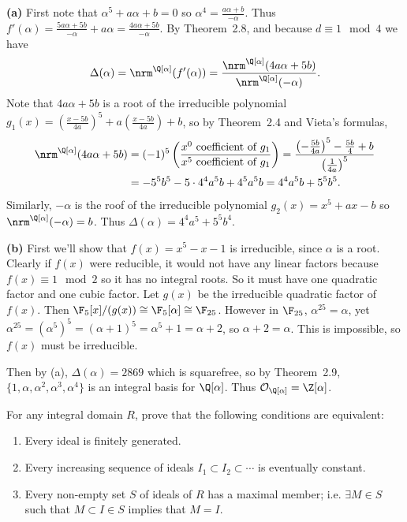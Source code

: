 \documentclass[11pt,letterpaper]{article}
\begin{document}
\begin{solution}
    \textbf{(a)} First note that $\alpha^5+a\alpha+b=0$ so $\alpha^4=\frac{a\alpha+b}{-\alpha}$. Thus $f'(\alpha)=\frac{5a\alpha+5b}{-\alpha}+a\alpha=\frac{4a\alpha+5b}{-\alpha}$. By Theorem~2.8, and because $d\equiv 1\mod 4$ we have
    \[
        \Delta(\alpha)=\nrm^{\Q[\alpha]}(f'(\alpha))=\frac{\nrm^{\Q[\alpha]}(4a\alpha+5b)}{\nrm^{\Q[\alpha]}(-\alpha)}
    .\]  
    Note that $4a\alpha+5b$ is a root of the irreducible polynomial $g_1(x)=\left(\frac{x-5b}{4a}\right)^5+a\left(\frac{x-5b}{4a}\right)+b$, so by Theorem~2.4 and Vieta's formulas,
    \[
        \begin{aligned}
            \nrm^{\Q[\alpha]}(4a\alpha+5b)&=(-1)^5\left(\frac{x^0\textrm{ coefficient of }g_1}{x^5\textrm{ coefficient of }g_1}\right)=\frac{\left(-\frac{5b}{4a}\right)^5-\frac{5b}{4}+b}{\left(\frac{1}{4a}\right)^5}\\
            &=-5^5b^5-5\cdot 4^4a^5b+4^5a^5b=4^4a^5b+5^5b^5.
        \end{aligned}
    \]  
    Similarly, $-\alpha$ is the roof of the irreducible polynomial $g_2(x)=x^5+ax-b$ so $\nrm^{\Q[\alpha]}(-\alpha)=b$. Thus $\Delta(\alpha)=4^4a^5+5^5b^4$.

    \textbf{(b)} First we'll show that $f(x)=x^5-x-1$ is irreducible, since $\alpha$ is a root. Clearly if $f(x)$ were reducible, it would not have any linear factors because $f(x)\equiv 1\mod 2$ so it has no integral roots. So it must have one quadratic factor and one cubic factor. Let $g(x)$ be the irreducible quadratic factor of $f(x)$. Then $\F_5[x]/(g(x))\cong \F_5[\alpha]\cong \F_{25}$. However in $\F_{25}$, $\alpha^25=\alpha$, yet $\alpha^25=(\alpha^5)^5=(\alpha+1)^5=\alpha^5+1=\alpha+2$, so $\alpha+2=\alpha$. This is impossible, so $f(x)$ must be irreducible.  
    
    Then by (a), $\Delta(\alpha)=2869$ which is squarefree, so by Theorem~2.9, $\{1,\alpha,\alpha^2,\alpha^3,\alpha^4\}$ is an integral basis for $\Q[\alpha]$. Thus $\mathcal{O}_{\Q[\alpha]}=\Z[\alpha]$.  
\end{solution}

\begin{cproblem}{3.1}
    For any integral domain $R$, prove that the following conditions are equivalent:
    \begin{enumerate}
        \item Every ideal is finitely generated.
        \item Every increasing sequence of ideals $I_1\subset I_2\subset \cdots$ is eventually constant.
        \item Every non-empty set $S$ of ideals of $R$ has a maximal member; i.e. $\exists M \in S$ such that $M\subset I\in S$ implies that $M=I$. 
    \end{enumerate}
\end{cproblem}
\end{document}

